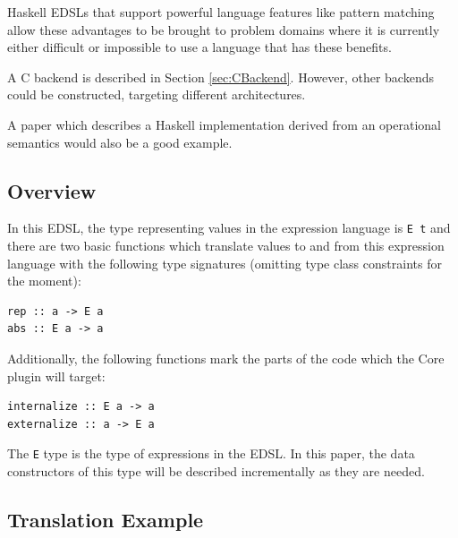 \documentclass[runningheads, a4paper]{llncs}
\newcommand{\ttt}{\texttt}
\newcommand{\showtodos}{}  %
\newenvironment{todo}
  {\ifthenelse{\isundefined{\showtodos}}{\comment}{\begin{tcolorbox}
    \textbf{TODO}:}}
  {\ifthenelse{\isundefined{\showtodos}}{\endcomment}{\end{tcolorbox}}
  }
\newenvironment{todont}
               {\comment}
               {\endcomment}
\begin{document}
Haskell EDSLs that support powerful language features like pattern matching
allow these advantages to be brought to problem domains where it is currently
either difficult or impossible to use a language that has these benefits.

A C backend is described in Section \ref{sec:CBackend}. However, other backends
could be constructed, targeting different architectures.

\begin{todont}

  A paper which describes a Haskell implementation derived from an operational
  semantics would also be a good example.
\end{todont}

\subsection{Overview}
\label{sec:Overview}

In this EDSL, the type representing values in the expression language is \ttt{E
t} and there are two basic functions which translate values to and from this
expression language with the following type signatures (omitting type class
constraints for the moment):

\begin{lstlisting}
rep :: a -> E a
abs :: E a -> a
\end{lstlisting}

Additionally, the following functions mark the parts of the code which the Core
plugin will target:

\begin{lstlisting}
internalize :: E a -> a
externalize :: a -> E a
\end{lstlisting}

The \ttt{E} type is the type of expressions in the EDSL.  In this paper, the
data constructors of this type will be described incrementally as they
are needed.

\subsection{Translation Example}

\end{document}
